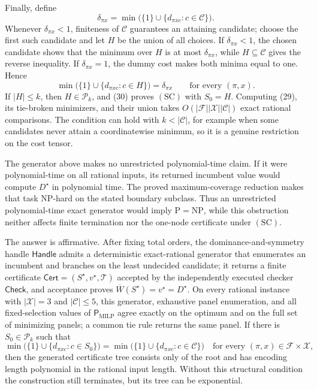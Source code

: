 Finally, define
\[
\delta_{\pi x}=
\min\bigl(\{1\}\cup\{d_{\pi xc}:c\in\mathcal C\}\bigr).              \tag{29}
\]
Whenever \(\delta_{\pi x}<1\), finiteness of \(\mathcal C\) guarantees an
attaining candidate; choose the first such candidate and let \(H\) be the
union of all choices.  If \(\delta_{\pi x}<1\), the chosen candidate shows
that the minimum over \(H\) is at most \(\delta_{\pi x}\), while
\(H\subseteq\mathcal C\) gives the reverse inequality.  If
\(\delta_{\pi x}=1\), the dummy cost makes both minima equal to one.  Hence
\[
\min\bigl(\{1\}\cup\{d_{\pi xc}:c\in H\}\bigr)=\delta_{\pi x}
\qquad\text{for every }(\pi,x).                                       \tag{30}
\]
If \(|H|\leq k\), then \(H\in\mathcal P_k\), and (30) proves
\(\mathrm{(SC)}\) with \(S_0=H\).  Computing (29), its tie-broken
minimizers, and their union takes
\(O(|\mathcal F||\mathcal X||\mathcal C|)\) exact rational comparisons.
The condition can hold with \(k<|\mathcal C|\), for example when some
candidates never attain a coordinatewise minimum, so it is a genuine
restriction on the cost tensor.

The generator above makes no unrestricted polynomial-time claim.  If it
were polynomial-time on all rational inputs, its returned incumbent value
would compute \(D^\star\) in polynomial time.  The proved maximum-coverage
reduction makes that task NP-hard on the stated boundary subclass.  Thus an
unrestricted polynomial-time exact generator would imply
\(\mathrm P=\mathrm{NP}\), while this obstruction neither affects finite
termination nor the one-node certificate under \(\mathrm{(SC)}\).

The answer is affirmative.  After fixing total orders, the
dominance-and-symmetry handle \(\mathsf{Handle}\) admits a deterministic
exact-rational generator that enumerates an incumbent and branches on the
least undecided candidate; it returns a finite certificate
\(\mathsf{Cert}=(S^\star,v^\star,\mathcal T)\) accepted by the independently
executed checker \(\mathsf{Check}\), and acceptance proves
\(\overline W(S^\star)=v^\star=D^\star\).  On every rational instance with
\(|\mathcal X|=3\) and \(|\mathcal C|\leq5\), this generator, exhaustive
panel enumeration, and all fixed-selection values of
\(\mathsf P_{\mathrm{MILP}}\) agree exactly on the optimum and on the full
set of minimizing panels; a common tie rule returns the same panel.  If
there is \(S_0\in\mathcal P_k\) such that
\[
\min\bigl(\{1\}\cup\{d_{\pi xc}:c\in S_0\}\bigr)
=\min\bigl(\{1\}\cup\{d_{\pi xc}:c\in\mathcal C\}\bigr)
\quad\text{for every }(\pi,x)\in\mathcal F\times\mathcal X,
\]
then the generated certificate tree consists only of the root and has
encoding length polynomial in the rational input length.  Without this
structural condition the construction still terminates, but its tree can
be exponential.

